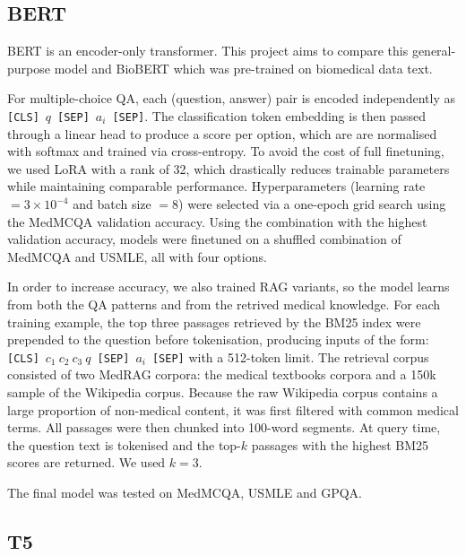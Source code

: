 \documentclass{article}
\begin{document}
\subsection{BERT}
BERT \cite{devlin2019bertpretrainingdeepbidirectional} is an encoder-only transformer. This project aims to compare this general-purpose model and BioBERT \cite{Lee_2019} which was pre-trained on biomedical data text.

For multiple-choice QA, each (question, answer) pair is encoded independently as \texttt{[CLS]}\ $q$\ \texttt{[SEP]}\ $a_i$\ \texttt{[SEP]}. The classification token embedding is then passed through a linear head to produce a score per option, which are are normalised with softmax and trained via cross-entropy. To avoid the cost of full finetuning, we used LoRA \cite{hu2021loralowrankadaptationlarge} with a rank of 32, which drastically reduces trainable parameters while maintaining comparable performance. Hyperparameters (learning rate $=3\times10^{-4}$ and batch size $=8$) were selected via a one-epoch grid search using the MedMCQA validation accuracy. Using the combination with the highest validation accuracy, models were finetuned on a shuffled combination of MedMCQA and USMLE, all with four options.

In order to increase accuracy, we also trained RAG \cite{lewis2021retrievalaugmentedgenerationknowledgeintensivenlp} variants, so the model learns from both the QA patterns and from the retrived medical knowledge. For each training example, the top three passages retrieved by the BM25 index \cite{lewis2021retrievalaugmentedgenerationknowledgeintensivenlp} were prepended to the question before tokenisation, producing inputs of the form: \texttt{[CLS]}\ $c_1\ c_2\ c_3\ q$\ \texttt{[SEP]}\ $a_i$\ \texttt{[SEP]} with a 512-token limit. The retrieval corpus consisted of two MedRAG corpora: the medical textbooks corpora and a 150k sample of the Wikipedia corpus. Because the raw Wikipedia corpus contains a large proportion of non-medical content, it was first filtered with common medical terms. All passages were then chunked into 100-word segments. At query time, the question text is tokenised and the top-$k$ passages with the highest BM25 scores are returned. We used $k=3$.

The final model was tested on MedMCQA, USMLE and GPQA.

\subsection{T5}
\end{document}
